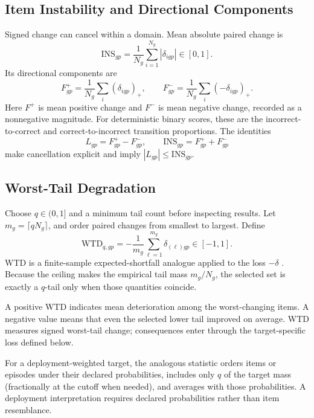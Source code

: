 \documentclass[12pt]{article}
\newcommand{\ins}{\mathrm{INS}}
\newcommand{\wtd}{\mathrm{WTD}}
\begin{document}
\subsection{Item Instability and Directional Components}\label{ssec:item_instability}

Signed change can cancel within a domain. Mean absolute paired change is
\begin{equation}\label{eq:ins}
\ins_{gp}=\frac{1}{N_g}\sum_{i=1}^{N_g}|\delta_{igp}|\in[0,1].
\end{equation}
Its directional components are
\[
F^+_{gp}=\frac{1}{N_g}\sum_i(\delta_{igp})_+,
\qquad
F^-_{gp}=\frac{1}{N_g}\sum_i(-\delta_{igp})_+.
\]
Here \(F^+\) is mean positive change and \(F^-\) is mean negative change, recorded as a nonnegative magnitude. For deterministic binary scores, these are the incorrect-to-correct and correct-to-incorrect transition proportions. The identities
\[
L_{gp}=F^+_{gp}-F^-_{gp},
\qquad
\ins_{gp}=F^+_{gp}+F^-_{gp}
\]
make cancellation explicit and imply \(|L_{gp}|\leq\ins_{gp}\).

\subsection{Worst-Tail Degradation}\label{ssec:wtd}

Choose \(q\in(0,1]\) and a minimum tail count before inspecting results. Let \(m_g=\lceil qN_g\rceil\), and order paired changes from smallest to largest. Define
\begin{equation}\label{eq:wtd}
\wtd_{q,gp}
=-\frac{1}{m_g}\sum_{\ell=1}^{m_g}\delta_{(\ell)gp}
\in[-1,1].
\end{equation}
WTD is a finite-sample expected-shortfall analogue applied to the loss \(-\delta\) \citep{acerbiTasche2002expectedShortfall,rockafellarUryasev2002cvar}. Because the ceiling makes the empirical tail mass \(m_g/N_g\), the selected set is exactly a \(q\)-tail only when those quantities coincide.

A positive WTD indicates mean deterioration among the worst-changing items. A negative value means that even the selected lower tail improved on average. WTD measures signed worst-tail change; consequences enter through the target-specific loss defined below.

For a deployment-weighted target, the analogous statistic orders items or episodes under their declared probabilities, includes only \(q\) of the target mass (fractionally at the cutoff when needed), and averages with those probabilities. A deployment interpretation requires declared probabilities rather than item resemblance.
\end{document}
